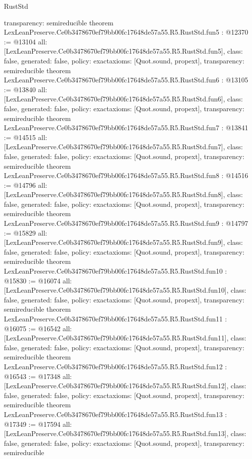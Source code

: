 \begin{lexlean}{RustStd}
\begin{coremodule}
{  transparency: semireducible
}
theorem LexLeanPreserve.Ce0b3478670ef79bb00fc17648de57a55.R5.RustStd.fun5 : @12370 := @13104 {
  all: [LexLeanPreserve.Ce0b3478670ef79bb00fc17648de57a55.R5.RustStd.fun5],
  class: false,
  generated: false,
  policy: exact{axioms: [Quot.sound, propext]},
  transparency: semireducible
}
theorem LexLeanPreserve.Ce0b3478670ef79bb00fc17648de57a55.R5.RustStd.fun6 : @13105 := @13840 {
  all: [LexLeanPreserve.Ce0b3478670ef79bb00fc17648de57a55.R5.RustStd.fun6],
  class: false,
  generated: false,
  policy: exact{axioms: [Quot.sound, propext]},
  transparency: semireducible
}
theorem LexLeanPreserve.Ce0b3478670ef79bb00fc17648de57a55.R5.RustStd.fun7 : @13841 := @14515 {
  all: [LexLeanPreserve.Ce0b3478670ef79bb00fc17648de57a55.R5.RustStd.fun7],
  class: false,
  generated: false,
  policy: exact{axioms: [Quot.sound, propext]},
  transparency: semireducible
}
theorem LexLeanPreserve.Ce0b3478670ef79bb00fc17648de57a55.R5.RustStd.fun8 : @14516 := @14796 {
  all: [LexLeanPreserve.Ce0b3478670ef79bb00fc17648de57a55.R5.RustStd.fun8],
  class: false,
  generated: false,
  policy: exact{axioms: [Quot.sound, propext]},
  transparency: semireducible
}
theorem LexLeanPreserve.Ce0b3478670ef79bb00fc17648de57a55.R5.RustStd.fun9 : @14797 := @15829 {
  all: [LexLeanPreserve.Ce0b3478670ef79bb00fc17648de57a55.R5.RustStd.fun9],
  class: false,
  generated: false,
  policy: exact{axioms: [Quot.sound, propext]},
  transparency: semireducible
}
theorem LexLeanPreserve.Ce0b3478670ef79bb00fc17648de57a55.R5.RustStd.fun10 : @15830 := @16074 {
  all: [LexLeanPreserve.Ce0b3478670ef79bb00fc17648de57a55.R5.RustStd.fun10],
  class: false,
  generated: false,
  policy: exact{axioms: [Quot.sound, propext]},
  transparency: semireducible
}
theorem LexLeanPreserve.Ce0b3478670ef79bb00fc17648de57a55.R5.RustStd.fun11 : @16075 := @16542 {
  all: [LexLeanPreserve.Ce0b3478670ef79bb00fc17648de57a55.R5.RustStd.fun11],
  class: false,
  generated: false,
  policy: exact{axioms: [Quot.sound, propext]},
  transparency: semireducible
}
theorem LexLeanPreserve.Ce0b3478670ef79bb00fc17648de57a55.R5.RustStd.fun12 : @16543 := @17348 {
  all: [LexLeanPreserve.Ce0b3478670ef79bb00fc17648de57a55.R5.RustStd.fun12],
  class: false,
  generated: false,
  policy: exact{axioms: [Quot.sound, propext]},
  transparency: semireducible
}
theorem LexLeanPreserve.Ce0b3478670ef79bb00fc17648de57a55.R5.RustStd.fun13 : @17349 := @17594 {
  all: [LexLeanPreserve.Ce0b3478670ef79bb00fc17648de57a55.R5.RustStd.fun13],
  class: false,
  generated: false,
  policy: exact{axioms: [Quot.sound, propext]},
  transparency: semireducible
}
\end{coremodule}
\end{lexlean}
